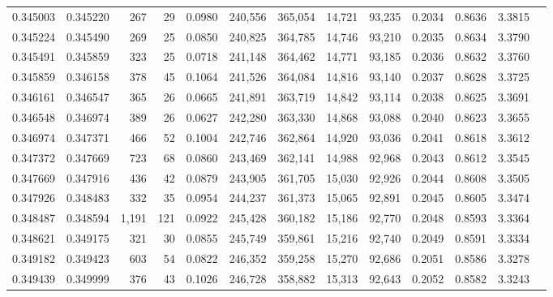 \begin{tabular}{rrrrrrrrrrrrr}
0.345003 & 0.345220 &   267 &  29 &                                     0.0980 & 240,556 & 365,054 &  14,721 &  93,235 & 0.2034 & 0.8636 & 3.3815 \\
0.345224 & 0.345490 &   269 &  25 &                                     0.0850 & 240,825 & 364,785 &  14,746 &  93,210 & 0.2035 & 0.8634 & 3.3790 \\
0.345491 & 0.345859 &   323 &  25 &                                     0.0718 & 241,148 & 364,462 &  14,771 &  93,185 & 0.2036 & 0.8632 & 3.3760 \\
0.345859 & 0.346158 &   378 &  45 &                                     0.1064 & 241,526 & 364,084 &  14,816 &  93,140 & 0.2037 & 0.8628 & 3.3725 \\
0.346161 & 0.346547 &   365 &  26 &                                     0.0665 & 241,891 & 363,719 &  14,842 &  93,114 & 0.2038 & 0.8625 & 3.3691 \\
0.346548 & 0.346974 &   389 &  26 &                                     0.0627 & 242,280 & 363,330 &  14,868 &  93,088 & 0.2040 & 0.8623 & 3.3655 \\
0.346974 & 0.347371 &   466 &  52 &                                     0.1004 & 242,746 & 362,864 &  14,920 &  93,036 & 0.2041 & 0.8618 & 3.3612 \\
0.347372 & 0.347669 &   723 &  68 &                                     0.0860 & 243,469 & 362,141 &  14,988 &  92,968 & 0.2043 & 0.8612 & 3.3545 \\
0.347669 & 0.347916 &   436 &  42 &                                     0.0879 & 243,905 & 361,705 &  15,030 &  92,926 & 0.2044 & 0.8608 & 3.3505 \\
0.347926 & 0.348483 &   332 &  35 &                                     0.0954 & 244,237 & 361,373 &  15,065 &  92,891 & 0.2045 & 0.8605 & 3.3474 \\
0.348487 & 0.348594 & 1,191 & 121 &                                     0.0922 & 245,428 & 360,182 &  15,186 &  92,770 & 0.2048 & 0.8593 & 3.3364 \\
0.348621 & 0.349175 &   321 &  30 &                                     0.0855 & 245,749 & 359,861 &  15,216 &  92,740 & 0.2049 & 0.8591 & 3.3334 \\
0.349182 & 0.349423 &   603 &  54 &                                     0.0822 & 246,352 & 359,258 &  15,270 &  92,686 & 0.2051 & 0.8586 & 3.3278 \\
0.349439 & 0.349999 &   376 &  43 &                                     0.1026 & 246,728 & 358,882 &  15,313 &  92,643 & 0.2052 & 0.8582 & 3.3243 \\

\end{tabular}
